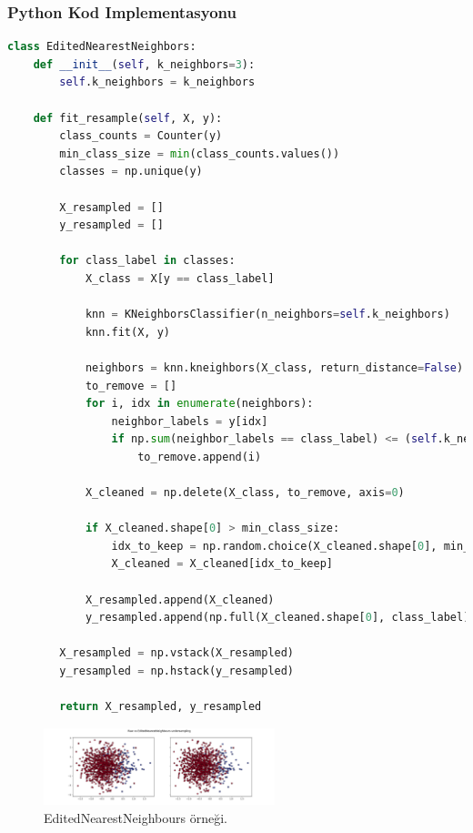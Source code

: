 \subsubsection{Python Kod Implementasyonu}

\begin{lstlisting}[language=Python]
class EditedNearestNeighbors:
    def __init__(self, k_neighbors=3):
        self.k_neighbors = k_neighbors

    def fit_resample(self, X, y):
        class_counts = Counter(y)
        min_class_size = min(class_counts.values())
        classes = np.unique(y)
        
        X_resampled = []
        y_resampled = []

        for class_label in classes:
            X_class = X[y == class_label]
            
            knn = KNeighborsClassifier(n_neighbors=self.k_neighbors)
            knn.fit(X, y)
            
            neighbors = knn.kneighbors(X_class, return_distance=False)
            to_remove = []
            for i, idx in enumerate(neighbors):
                neighbor_labels = y[idx]
                if np.sum(neighbor_labels == class_label) <= (self.k_neighbors // 2):
                    to_remove.append(i)

            X_cleaned = np.delete(X_class, to_remove, axis=0)
            
            if X_cleaned.shape[0] > min_class_size:
                idx_to_keep = np.random.choice(X_cleaned.shape[0], min_class_size, replace=False)
                X_cleaned = X_cleaned[idx_to_keep]

            X_resampled.append(X_cleaned)
            y_resampled.append(np.full(X_cleaned.shape[0], class_label))

        X_resampled = np.vstack(X_resampled)
        y_resampled = np.hstack(y_resampled)

        return X_resampled, y_resampled
\end{lstlisting}

\begin{figure}[h]
    \centering
    \includegraphics[width=0.6\textwidth]{images/Raw vs EditedNearestNeighbours undersampling.png}
    \caption{EditedNearestNeighbours örneği.}
    \label{fig:enter-label}
\end{figure}

